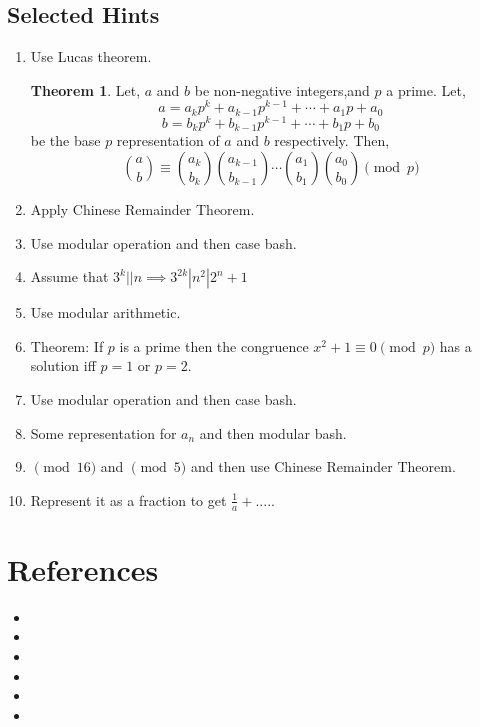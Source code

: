\documentclass[a4paper,oneside,12 pt]{book}
\theoremstyle{definition}
\theoremstyle{definition}
\theoremstyle{definition}
\newtheorem{theorem}{Theorem} [section]
\begin{document}
\section{Selected Hints}
\begin{enumerate}
\item Use Lucas theorem.
\begin{theorem}
Let, $a$ and $b$ be non-negative integers,and $p$ a prime. Let,
$$a=a_kp^k+a_{k-1}p^{k-1}+\cdots+a_1p+a_0$$
$$b=b_kp^k+b_{k-1}p^{k-1}+\cdots+b_1p+b_0$$
be the base $p$ representation of $a$ and $b$ respectively. Then,
$${\binom{a}{b}} \equiv {\binom{a_k}{b_k}}{\binom{a_{k-1}}{b_{k-1}}}\cdots {\binom{a_1}{b_1}}{\binom{a_0}{b_0}} \pmod{p}$$
\end{theorem}
\item Apply Chinese Remainder Theorem.

\item Use modular operation and then case bash.

\item Assume that $3^k||n \implies 3^{2k}| n^2 |2^n+1$

\item Use modular arithmetic.
\item Theorem: If $p$ is a prime then the congruence $x^2+1\equiv 0 \pmod {p}$ has a solution iff $p=1$ or $p=2$.
\item Use modular operation and then case bash.

\item Some representation for $a_n$ and then modular bash.
\item $\pmod{16}$ and $\pmod{5}$ and then use Chinese Remainder Theorem.
\item Represent it as a fraction to get $\frac{1}{a}+....$.


\end{enumerate}



\backmatter


\chapter{References}
\begin{itemize}
\item 
\item
\item 
\item
\item 
\item
\end{itemize}
\end{document}
